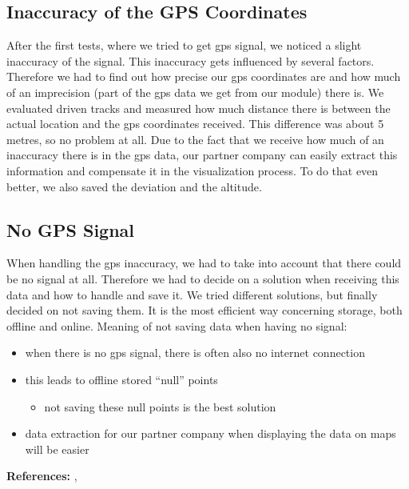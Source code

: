 \subsection{Inaccuracy of the GPS Coordinates}
After the first tests, where we tried to get \gls{gps} signal, we noticed a slight inaccuracy of the signal. This inaccuracy gets influenced by several factors. Therefore we had to find out how precise our \gls{gps} coordinates are and how much of an imprecision (part of the \gls{gps} data we get from our module) there is. 
\newline \newline
We evaluated driven tracks and measured how much distance there is between the actual location and the \gls{gps} coordinates received. This difference was about 5 metres, so no problem at all. 
\newline \newline
Due to the fact that we receive how much of an inaccuracy there is in the \gls{gps} data, our partner company can easily extract this information and compensate it in the visualization process. To do that even better, we also saved the deviation and the altitude.

\begin{center}
\end{center}

\subsection{No GPS Signal}
When handling the \gls{gps} inaccuracy, we had to take into account that there could be no signal at all. Therefore we had to decide on a solution when receiving this data and how to handle and save it.
\newline \newline
We tried different solutions, but finally decided on not saving them. It is the most efficient way concerning storage, both offline and online.
\newline \newline
Meaning of not saving data when having no signal:
\begin{itemize}
\item when there is no \gls{gps} signal, there is often also no internet connection
\item this leads to offline stored “null” points
	\begin{itemize}
	\item not saving these null points is the best solution
	\end{itemize}		
\item data extraction for our partner company when displaying the data on maps will be easier
\end{itemize}
\textbf{References:}  \cite{Git}, \cite{Gpsd4java}
\clearpageauthor
\newpage
